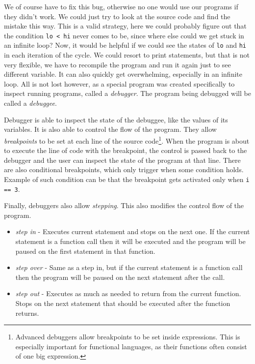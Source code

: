 We of course have to fix this bug, otherwise no one would use our programs if
they didn't work. We could just try to look at the source code and find the
mistake this way. This is a valid strategy, here we could probably figure out
that the condition \texttt{lo < hi} never comes to be, since where else could
we get stuck in an infinite loop? Now, it would be helpful if we could see the
states of \texttt{lo} and \texttt{hi} in each iteration of the cycle. We could
resort to print statements, but that is not very flexible, we have to recompile
the program and run it again just to see different variable. It can also
quickly get overwhelming, especially in an infinite loop. All is not lost
however, as a special program was created specifically to inspect running
programs, called a \textit{debugger}. The program being debugged will be called
a \textit{debuggee}.

Debugger is able to inspect the state of the debuggee, like the values of its
variables. It is also able to control the flow of the program. They allow
\textit{breakpoints} to be set at each line of the source
code\footnote{Advanced debuggers allow breakpoints to be set inside
expressions. This is especially important for functional languages, as their
functions often consist of one big expression.}. When the program is about to
execute the line of code with the breakpoint, the control is passed back to the
debugger and the user can inspect the state of the program at that line. There
are also conditional breakpoints, which only trigger when some condition holds.
Example of such condition can be that the breakpoint gets activated only when
\texttt{i == 3}.

Finally, debuggers also allow \textit{stepping}. This also modifies the control
flow of the program.
\begin{itemize}
    \item \textit{step in} - Executes current statement and stops on the next
        one. If the current statement is a function call then it will be
        executed and the program will be paused on the first statement in that
        function.
    \item \textit{step over} - Same as a step in, but if the current statement
        is a function call then the program will be paused on the next
        statement after the call.
    \item \textit{step out} -  Executes as much as needed to return from the
        current function. Stops on the next statement that should be executed
        after the function returns.
\end{itemize}


